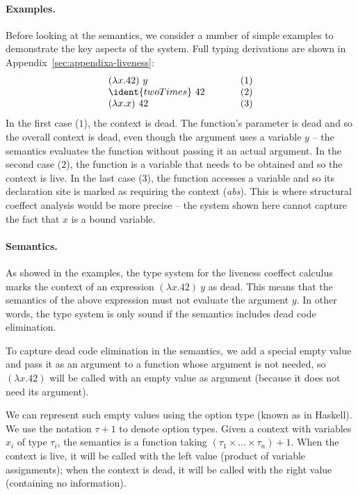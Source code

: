 \paragraph{Examples.}
Before looking at the semantics, we consider a number of simple examples to demonstrate the
key aspects of the system. Full typing derivations are shown in Appendix~\ref{sec:appendixa-liveness}:
%
\begin{equation*}
\begin{array}{lll}
(\lambda x . 42)~y &~\hspace{1em}~&(1)\\
\ident{twoTimes}~42          &&(2)\\
(\lambda x . x)~42 &&(3)\\
\end{array}
\end{equation*}
%
In the first case ($1$), the context is dead. The function's parameter is dead and so the
overall context is dead, even though the argument uses a variable $y$ -- the semantics evaluates
the function without passing it an actual argument. In the second case ($2$), the function is
a variable that needs to be obtained and so the context is live. In the last case ($3$), the
function accesses a variable and so its declaration site is marked as requiring the context
(\emph{abs}). This is where structural coeffect analysis would be more precise -- the system shown
here cannot capture the fact that $x$ is a bound variable.


\paragraph{Semantics.}
As showed in the examples, the type system for the liveness coeffect calculus marks the context
of an expression $(\lambda x.42)~y$ as dead. This means that the semantics of the above expression
must not evaluate the argument $y$. In other words, the type system is only sound if the semantics
includes dead code elimination.

To capture dead code elimination in the semantics, we add a special empty value and pass it as an
argument to a function whose argument is not needed, so $(\lambda x.42)$ will be called with
an empty value as argument (because it does not need its argument).

We can represent such empty values using the option type (known as  in Haskell).
We use the notation $\tau + 1$ to denote option types. Given a context with variables $x_i$ of
type $\tau_i$, the semantics is a function taking $(\tau_1 \times \ldots \times \tau_n) + 1$.
When the context is live, it will be called with the left value (product of variable assignments);
when the context is dead, it will be called with the right value (containing no information).

